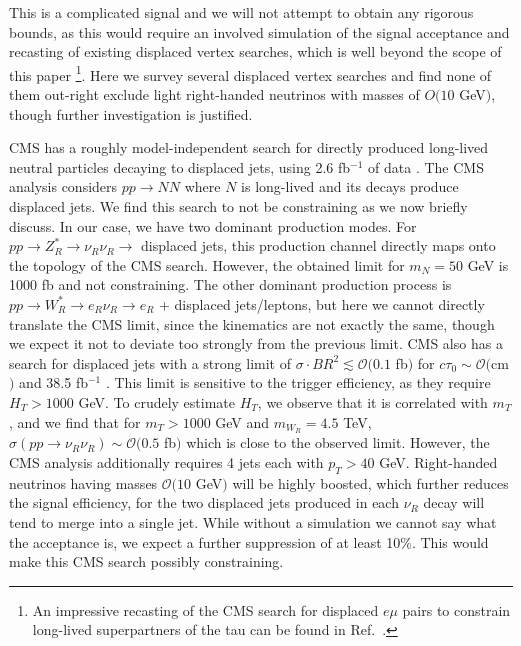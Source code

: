 \documentclass[letterpaper,11pt]{article}
\newcommand{\Or}{\mathcal O}
\newcommand\lsim{\lesssim}
\begin{document}
This is a complicated signal and we will not attempt to obtain any rigorous bounds, as this would require an involved simulation of the signal acceptance and recasting of existing displaced 
vertex searches, which is well beyond 
the scope of this paper \footnote{An impressive recasting of the
CMS search for displaced $e \mu$ pairs  \cite{Khachatryan:2014mea} to constrain long-lived superpartners of the tau can be found in Ref.\ \cite{Evans:2016zau}.}. 
Here we survey several displaced vertex searches and find none of them out-right exclude light right-handed neutrinos with masses of $O(10$ GeV$)$, though further investigation is justified. 

CMS has a 
roughly model-independent search for directly produced long-lived neutral particles decaying to displaced jets, using 2.6 fb$^{-1}$ of data \cite{Sirunyan:2017jdo}. The CMS analysis considers 
 $p p \rightarrow  N N $ where $N$ is long-lived and its decays produce displaced jets. We find this search to not be constraining as we now briefly discuss.
In our case, we have two dominant production modes. For $p p \rightarrow Z^*_R  \rightarrow \nu_R \nu_R \rightarrow$ displaced jets, this production 
channel directly maps onto the topology of the CMS search. However, the obtained limit for $m_{N} = 50$ GeV is 1000 fb and not constraining.
The other dominant production process is $p p \rightarrow W^*_R  \rightarrow e_R \nu_R \rightarrow e_R$ + displaced jets/leptons, but here we cannot directly translate the CMS limit, since the kinematics are not exactly the same, though we expect it not to deviate too strongly from the previous limit. CMS also has a search for displaced jets with a strong limit of $\sigma \cdot BR^2 \lsim \Or(0.1$ fb$)$ for $c\tau_0 \sim \Or($cm$)$ and 38.5 fb$^{-1}$ \cite{CMS:LongLivedParticles}. This limit is sensitive to the trigger efficiency, as they require $H_T>1000$ GeV. To crudely estimate $H_T$, we observe that it is 
correlated with $m_T$, and we find that for $m_T>1000$ GeV and $m_{W_R}=4.5$ TeV, $\sigma (pp \rightarrow \nu_R \nu_R) \sim \Or(0.5$ fb$)$ which is close to the observed limit. However, the CMS analysis 
additionally requires 4 jets each with $p_T > 40$ GeV. Right-handed neutrinos having masses $\Or(10$ GeV$)$ will be highly boosted, which further reduces
the signal efficiency, for the two displaced jets produced 
in each $\nu_R$ decay will tend to merge into a single jet. While without a simulation we cannot say what the acceptance is, we expect a further suppression of at least 10\%. This would make this CMS search possibly constraining. 
\end{document}
